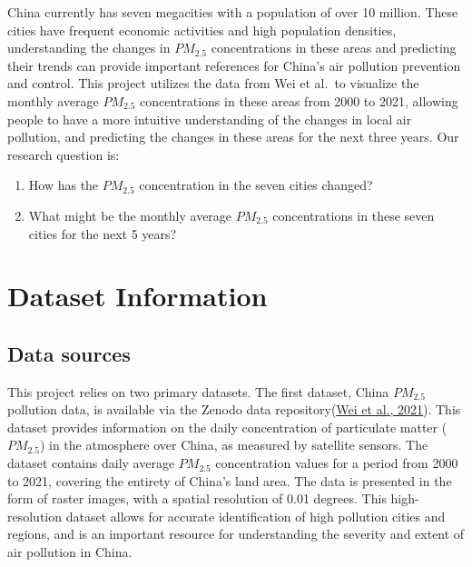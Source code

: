\documentclass[
  12pt,
]{article}
\providecommand{\tightlist}{%
  \setlength{\itemsep}{0pt}\setlength{\parskip}{0pt}}
\begin{document}
China currently has seven megacities with a population of over 10
million. These cities have frequent economic activities and high
population densities, understanding the changes in \(PM_{2.5}\)
concentrations in these areas and predicting their trends can provide
important references for China's air pollution prevention and control.
This project utilizes the data from Wei et al.~to visualize the monthly
average \(PM_{2.5}\) concentrations in these areas from 2000 to 2021,
allowing people to have a more intuitive understanding of the changes in
local air pollution, and predicting the changes in these areas for the
next three years. Our research question is:

\begin{enumerate}
\def\labelenumi{\arabic{enumi}.}
\tightlist
\item
  How has the \(PM_{2.5}\) concentration in the seven cities changed?
\item
  What might be the monthly average \(PM_{2.5}\) concentrations in these
  seven cities for the next 5 years?
\end{enumerate}

\newpage

\hypertarget{dataset-information}{%
\section{Dataset Information}\label{dataset-information}}

\hypertarget{data-sources}{%
\subsection{Data sources}\label{data-sources}}

This project relies on two primary datasets. The first dataset, China
\(PM_{2.5}\) pollution data, is available via the Zenodo data
repository(\protect\hyperlink{ref-wei2021reconstructing}{Wei et al.,
2021}). This dataset provides information on the daily concentration of
particulate matter (\(PM_{2.5}\)) in the atmosphere over China, as
measured by satellite sensors. The dataset contains daily average
\(PM_{2.5}\) concentration values for a period from 2000 to 2021,
covering the entirety of China's land area. The data is presented in the
form of raster images, with a spatial resolution of 0.01 degrees. This
high-resolution dataset allows for accurate identification of high
pollution cities and regions, and is an important resource for
understanding the severity and extent of air pollution in China.
\end{document}
